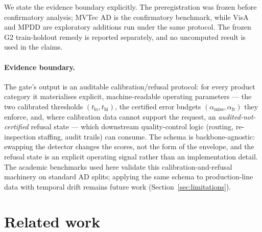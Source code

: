 \documentclass[preprint,11pt]{elsarticle}
\begin{document}
We state the evidence boundary explicitly. The preregistration was frozen before confirmatory analysis;
MVTec AD is the confirmatory benchmark, while VisA and MPDD are exploratory additions run
under the same protocol. The frozen G2 train-holdout remedy is reported separately, and no
uncomputed result is used in the claims.

\paragraph{Evidence boundary.}
The gate's output is an auditable calibration/refusal protocol: for every product
category it materialises explicit, machine-readable operating parameters --- the two calibrated
thresholds $(t_{\text{lo}}, t_{\text{hi}})$, the certified error budgets
$(\alpha_{\text{miss}}, \alpha_{\text{fr}})$ they enforce, and, where calibration data cannot
support the request, an \emph{audited-not-certified} refusal state --- which downstream
quality-control logic (routing, re-inspection staffing, audit trails) can consume. The
schema is backbone-agnostic: swapping the detector changes the scores, not the form of the
envelope, and the refusal state is an explicit operating signal rather than an implementation
detail. The academic benchmarks used here validate this calibration-and-refusal machinery on
standard AD splits; applying the same schema to production-line data with temporal drift remains
future work (Section~\ref{sec:limitations}).

\section{Related work}
\label{sec:related}
\end{document}
